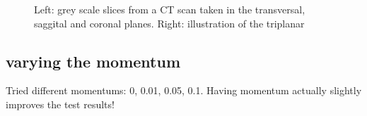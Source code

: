 \begin{figure}
\centering
\begin{minipage}{0.45\textwidth}
\centering
{}
\end{minipage}\hfill
\hspace{-1cm}
\begin{minipage}{0.45\textwidth}
\centering
{}
\end{minipage}
\caption{Left: grey scale slices from a CT scan taken in the transversal, saggital and coronal planes. Right: illustration of the triplanar}
\end{figure}

\subsection{varying the momentum}

Tried different momentums: 0, 0.01, 0.05, 0.1. Having momentum actually slightly improves the test results!

